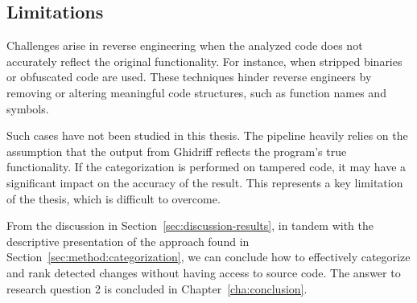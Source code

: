 \subsection{Limitations}

Challenges arise in reverse engineering when the analyzed code does not accurately reflect the original functionality. For instance, when stripped binaries or obfuscated code are used. These techniques hinder reverse engineers by removing or altering meaningful code structures, such as function names and symbols.

Such cases have not been studied in this thesis. The pipeline heavily relies on the assumption that the output from Ghidriff reflects the program's true functionality. If the categorization is performed on tampered code, it may have a significant impact on the accuracy of the result. This represents a key limitation of the thesis, which is difficult to overcome.



\begin{rqs}
    From the discussion in Section~\ref{sec:discussion-results}, in tandem with the descriptive presentation of the approach found in Section~\ref{sec:method:categorization}, we can conclude how to effectively categorize and rank detected changes without having access to source code. The answer to  research question 2 is concluded in Chapter~\ref{cha:conclusion}.
\end{rqs}



